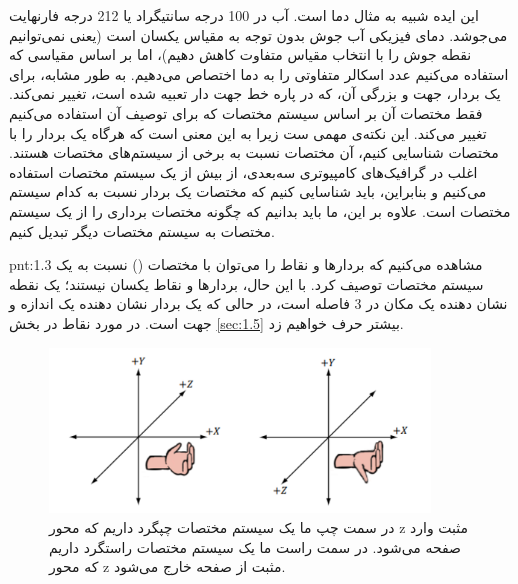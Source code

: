 {\begin{spacing}{1.5}
        این ایده شبیه به مثال دما است. آب در 100 درجه سانتیگراد یا 212 درجه فارنهایت می‌جوشد.
        دمای فیزیکی آب جوش بدون توجه به مقیاس یکسان است (یعنی نمی‌توانیم نقطه جوش را با انتخاب مقیاس متفاوت کاهش دهیم)،
        اما بر اساس مقیاسی که استفاده می‌کنیم عدد اسکالر متفاوتی را به دما اختصاص می‌دهیم.
        به طور مشابه، برای یک بردار، جهت و بزرگی آن، که در پاره خط جهت دار تعبیه شده است، تغییر نمی‌کند.
        فقط مختصات آن بر اساس سیستم مختصات که برای توصیف آن استفاده می‌کنیم تغییر می‌کند.
        این نکته‌ی مهمی ست زیرا به این معنی است که هرگاه یک بردار را با مختصات شناسایی کنیم، آن مختصات نسبت به برخی از سیستم‌های مختصات هستند.
        اغلب در گرافیک‌های کامپیوتری سه‌بعدی، از بیش از یک سیستم مختصات استفاده می‌کنیم و بنابراین، باید شناسایی کنیم که مختصات یک بردار نسبت به کدام سیستم مختصات است.
        علاوه بر این، ما باید بدانیم که چگونه مختصات برداری را از یک سیستم مختصات به سیستم مختصات دیگر تبدیل کنیم.
        \textbf{\vspace{-10pt}}
        \begin{point}{pnt:1.3}
            \Large
            مشاهده می‌کنیم که بردارها و نقاط را می‌توان با مختصات () نسبت به یک سیستم مختصات توصیف کرد.
            با این حال، بردارها و نقاط یکسان نیستند؛ یک نقطه نشان دهنده یک مکان در 3 فاصله است، در حالی که یک بردار نشان دهنده یک اندازه و جهت است.
            در مورد نقاط در بخش \ref{sec:1.5} بیشتر حرف خواهیم زد.
        \end{point}
        \textbf{\vspace{-50pt}}
    \end{spacing}

    \begin{figure}[H]
        \centering
        \setlength{\belowcaptionskip}{-10pt}
        \includegraphics[width=0.9\textwidth]{Images/4/1/4.Session.1.1.5}
        \caption{در سمت چپ ما یک سیستم مختصات چپگرد داریم که محور z مثبت وارد صفحه می‌شود. در سمت راست ما یک سیستم مختصات راستگرد داریم که محور z مثبت از صفحه خارج می‌شود.}
        \label{fig:4.Session.1.1.5}
    \end{figure}
}

